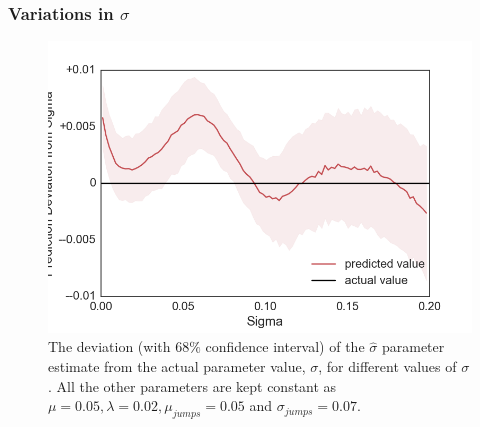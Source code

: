 \documentclass[11pt,oneside,openany,a4paper,english, report, goldenblock
]{usthesis}
\begin{document}
\clearpage
\subsubsection{Variations in $\sigma$}
\begin{figure}[!htb]
	\centering
	\includegraphics[width=0.43\linewidth]{Images/Output-Sensitivity-Results/ConvolutionalNN-MultipleOutput-ELU/Varying-Sigma/Sigma}
	\caption{The deviation (with $68\%$ confidence interval) of the $\hat{\sigma}$ parameter estimate from the actual parameter value, $\sigma$, for different values of $\sigma$. All the other parameters are kept constant as $\mu = 0.05, \lambda = 0.02, \mu_{jumps} = 0.05$ and $\sigma_{jumps} = 0.07$.}
	\label{fig:appendix:sensitivity_test:multiple_output:varying_sigma:sigma}
\end{figure}
\end{document}
